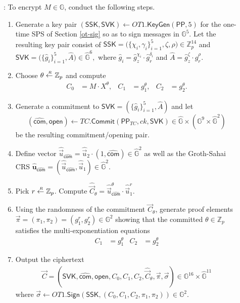 \documentclass[10pt]{llncs}
\newcommand{\G}{\mathbb{G}}
\newcommand{\Z}{\mathbb{Z}}
\newcommand{\PK}{\mathsf{PK}}
\newcommand{\SSK}{\mathsf{SSK}}
\newcommand{\SVK}{\mathsf{SVK}}
\newcommand{\com}{\hat{\mathsf{com}}}
\newcommand{\open}{\mathsf{open}}
\newcommand{\sample}{\stackrel{{\scriptscriptstyle \mkern4mu R}}{\gets}}
\newcommand{\KeyGen}{{\mathsf{KeyGen}}}
\newcommand{\Enc}{{\mathsf{Encrypt}}}
\newcommand{\Sig}{{\mathsf{Sign}}}
\newcommand{\Com}{{\mathsf{Commit}}}
\newcommand{\PPP}{\mathsf{PP}}
\begin{document}
\begin{description}
\item[\boldmath{$\Enc(M,\PK)$}]: To encrypt $M \in \G$, 
conduct the following steps. \smallskip  \smallskip 
  \begin{enumerate}
  \item Generate a  key pair $(\SSK, \SVK) \gets OT1.\KeyGen(\PPP,5)$ 
    for the one-time SPS of Section \ref{ot-sig} so as to sign messages 
    in $\G^5$. Let the resulting key pair consist of $\SSK = \big( \{\chi_i, 
    \gamma_i\}_{i=1}^5, \zeta, \rho \big) \in \mathbb{Z}_p^{14}$ 
	and $ \SVK = \big( \{\hat{g}_i\}_{i =1}^5, \hat{A}  \big) \in \hat{\G}^6,$
    where  $\hat{g}_i=\hat{g}_z^{\chi_i} \cdot \hat{g}_r^{\delta_i}$ and 
    $\hat{A}=\hat{g}_z^{\zeta} \cdot \hat{g}_r^{\rho}$.
  \item Choose $\theta \sample \mathbb{Z}_p$ and compute
    \begin{align*}
      C_0 &= M\cdot X^{\theta}, & C_1 &= g_1^{\theta}, & C_2 &= g_2^{\theta}.
    \end{align*}
  \item \label{it:SPCCA-com} Generate a commitment to 
    $\SVK = (\{\hat{g}_i\}_{i =1}^5, \hat{A})$ and let $$(\com, \open) \gets 
    TC.\Com(\PPP_{TC}, {ck}, \SVK) \in \hat{\G} \times (\G^9 \times \hat{\G}^2)$$
    be the resulting commitment/opening pair.
  \item Define vector $\hat{\vec{u}}_{\com} = \hat{\vec{u}}_2\cdot (1, \com) 
    \in \hat{\G}^2$ as well as the Groth-Sahai CRS $\hat{\mathbf{u}}_{\com}
    =(\hat{\vec{u}}_{\com},\hat{\vec{u}}_1) \in \hat{\G}^2$. 
  \item Pick $r \sample \mathbb{Z}_p$. Compute $\hat{\vec{C}}_{\theta} 
    = \hat{\vec{u}}_{\com}^{\theta} \cdot \hat{\vec{u}}_1^r$.
  \item Using the randomness of the commitment $\vec{C}_{\theta}$, generate  
    proof elements $\vec{\pi}=(\pi_1,\pi_2)=(g_1^r,g_2^r) \in \G^2$ showing 
    that the committed $\theta \in \Z_p$ satisfies the multi-exponentiation 
    equations
    \begin{align*}
      C_1 &= g_1^{\theta} & C_2 &= g_2^{\theta}
    \end{align*}
  \item Output the ciphertext
    \begin{align} \label{SPS-CT} 
      \vec{C} = (\SVK, \com, \open, C_0, C_1, C_2, \hat{\vec{C}}_{\theta}, 
                \vec{\pi}, \vec{\sigma}) \in \G^{16} \times \hat{\G}^{11}
    \end{align}
    where $\vec{\sigma} \leftarrow OT1.\Sig(\SSK, (C_0, C_1, C_2, {\pi}_1,\pi_2)) 
    \in \G^2$.  \medskip  \smallskip


\end{enumerate}
\end{description}
\end{document}
